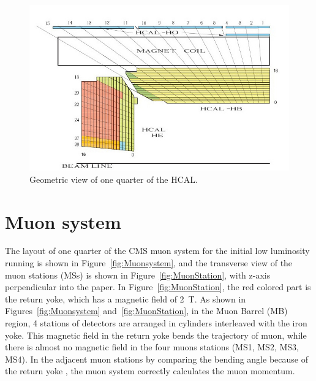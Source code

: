  
\begin{figure}
\centering
\includegraphics[width=.9\textwidth]{figures/Hcal.jpg}
\caption{Geometric view of one quarter of the HCAL.}
\label{figs:HCAL}
\end{figure}
  
  
\section{Muon system}

The layout of one quarter of the CMS muon system for the initial low luminosity running is shown in 
Figure~\ref{fig:Muonsystem},  and the transverse view of the muon stations (MSs) is shown in 
Figure~\ref{fig:MuonStation}, with z-axis perpendicular into the paper. In 
Figure~\ref{fig:MuonStation}, the red colored part is the return yoke, which has a magnetic field of
2~T. As shown in Figures~\ref{fig:Muonsystem} and~\ref{fig:MuonStation},  in the Muon Barrel (MB) region, 4 stations of detectors are arranged in cylinders interleaved with the iron yoke.   
This magnetic field in the return yoke bends the trajectory of muon, while there is almost no magnetic field in the 
four muons stations (MS1, MS2, MS3, MS4). In the adjacent muon stations by comparing the bending angle because of the return yoke , the muon system correctly calculates the muon momentum. 


